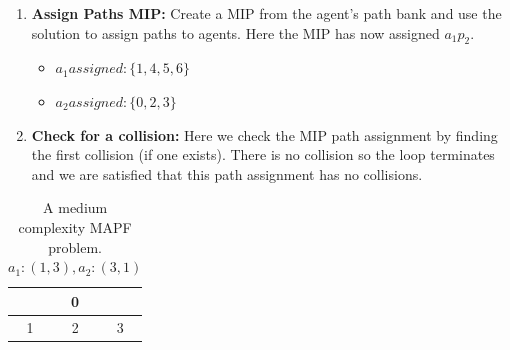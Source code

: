 \documentclass[a4paper,11pt]{article}
\begin{document}
\begin{enumerate}
	\item \textbf{Assign Paths MIP:} Create a MIP from the agent's path bank and use the solution to assign paths to agents. Here the MIP has now assigned $a_1p_2$.
	\begin{itemize}
		\item $a_1assigned: \{1, 4, 5, 6\}$
		\item $a_2assigned: \{0, 2, 3\}$
	\end{itemize}
	\item \textbf{Check for a collision:} Here we check the MIP path assignment by finding the first collision (if one exists). There is no collision so the loop terminates and we are satisfied that this path assignment has no collisions.
\end{enumerate}

\begin{table}[h]
	\centering
	\footnotesize
	\begin{tabular}{|c|c|c|}
		\hline
		\cellcolor{black} & 0 & \cellcolor{black} \\ \hline
		1 & 2 & 3 \\ \hline
	\end{tabular}
	
	\caption{A medium complexity MAPF problem. $a_1: (1, 3), a_2: (3, 1)$}
	\label{fig:complex-step-through-example}
\end{table}
\end{document}
